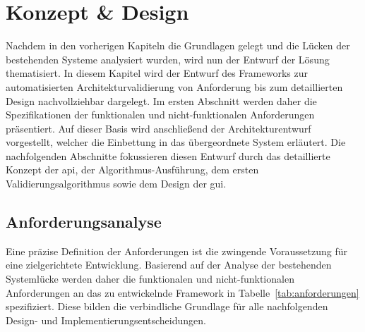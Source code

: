 
\chapter{Konzept \& Design}
\label{ch:KuD}

Nachdem in den vorherigen Kapiteln die Grundlagen gelegt und die Lücken der bestehenden Systeme analysiert wurden, wird nun der Entwurf der Lösung thematisiert. In diesem Kapitel wird der Entwurf des Frameworks zur automatisierten Architekturvalidierung von Anforderung bis zum detaillierten Design nachvollziehbar dargelegt. Im ersten Abschnitt werden daher die Spezifikationen der funktionalen und nicht-funktionalen Anforderungen präsentiert. Auf dieser Basis wird anschließend der Architekturentwurf vorgestellt, welcher die Einbettung in das übergeordnete System erläutert. Die nachfolgenden Abschnitte fokussieren diesen Entwurf durch das detaillierte Konzept der \gls{api}, der Algorithmus-Ausführung, dem ersten Validierungsalgorithmus sowie dem Design der \gls{gui}.


\section{Anforderungsanalyse}
\label{sec:Anforderungsanalyse}

Eine präzise Definition der Anforderungen ist die zwingende Voraussetzung für eine zielgerichtete Entwicklung. Basierend auf der Analyse der bestehenden Systemlücke werden daher die funktionalen und nicht-funktionalen Anforderungen an das zu entwickelnde Framework in Tabelle~\ref{tab:anforderungen} spezifiziert. Diese bilden die verbindliche Grundlage für alle nachfolgenden Design- und Implementierungsentscheidungen.

